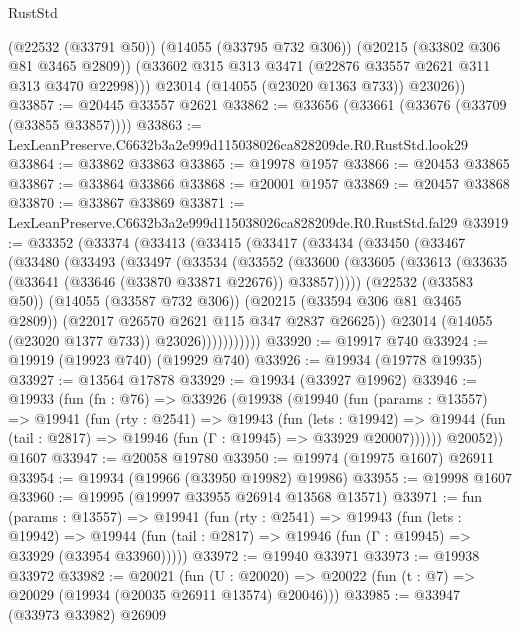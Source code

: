 \begin{lexlean}{RustStd}
\begin{coremodule}
          (@22532 (@33791 @50))
          (@14055 (@33795 @732 @306))
          (@20215 (@33802 @306 @81 @3465 @2809))
          (@33602 @315 @313 @3471 (@22876 @33557 @2621 @311 @313 @3470 @22998)))
        @23014
        (@14055 (@23020 @1363 @733))
        @23026))
@33857 := @20445 @33557 @2621
@33862 := @33656 (@33661 (@33676 (@33709 (@33855 @33857))))
@33863 := LexLeanPreserve.C6632b3a2e999d115038026ca828209de.R0.RustStd.look29
@33864 := @33862 @33863
@33865 := @19978 @1957
@33866 := @20453 @33865
@33867 := @33864 @33866
@33868 := @20001 @1957
@33869 := @20457 @33868
@33870 := @33867 @33869
@33871 := LexLeanPreserve.C6632b3a2e999d115038026ca828209de.R0.RustStd.fal29
@33919 := @33352
    (@33374
      (@33413
        (@33415
          (@33417
            (@33434
              (@33450
                (@33467
                  (@33480
                    (@33493
                      (@33497
                        (@33534
                          (@33552
                            (@33600
                              (@33605
                                (@33613 (@33635 (@33641 (@33646 (@33870 @33871 @22676)) @33857)))))
                            (@22532 (@33583 @50))
                            (@14055 (@33587 @732 @306))
                            (@20215 (@33594 @306 @81 @3465 @2809))
                            (@22017 @26570 @2621 @115 @347 @2837 @26625))
                          @23014
                          (@14055 (@23020 @1377 @733))
                          @23026)))))))))))
@33920 := @19917 @740
@33924 := @19919 (@19923 @740) (@19929 @740)
@33926 := @19934 (@19778 @19935)
@33927 := @13564 @17878
@33929 := @19934 (@33927 @19962)
@33946 := @19933
    (fun (fn : @76) =>
    @33926
      (@19938
        (@19940
          (fun (params : @13557) =>
          @19941
            (fun (rty : @2541) =>
            @19943
              (fun (lets : @19942) =>
              @19944 (fun (tail : @2817) => @19946 (fun (Γ : @19945) => @33929 @20007))))))
        @20052))
    @1607
@33947 := @20058 @19780
@33950 := @19974 (@19975 @1607) @26911
@33954 := @19934 (@19966 (@33950 @19982) @19986)
@33955 := @19998 @1607
@33960 := @19995 (@19997 @33955 @26914 @13568 @13571)
@33971 := fun (params : @13557) =>
  @19941
    (fun (rty : @2541) =>
    @19943
      (fun (lets : @19942) =>
      @19944 (fun (tail : @2817) => @19946 (fun (Γ : @19945) => @33929 (@33954 @33960)))))
@33972 := @19940 @33971
@33973 := @19938 @33972
@33982 := @20021
    (fun (U : @20020) => @20022 (fun (t : @7) => @20029 (@19934 (@20035 @26911 @13574) @20046)))
@33985 := @33947 (@33973 @33982) @26909

\end{coremodule}
\end{lexlean}

